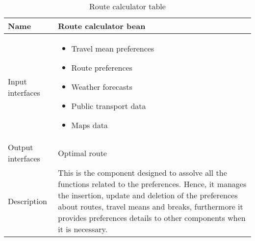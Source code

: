 \begin{flushleft}
	
	\begin{table}[htp]
		
		\begin{tabular}{l|p{7cm}}
		
			Name&\textbf{Route calculator bean}\\
			\hline
			\hline
			Input interfaces& 
			\begin{itemize}
				\item Travel mean preferences \item Route preferences \item Weather forecasts \item Public transport data \item Maps data
			\end{itemize} \\
			\hline
			Output interfaces& Optimal route\\
			\hline
			Description&This is the component designed to assolve all the functions related to the preferences. Hence, it manages the insertion, update and deletion of the preferences about routes, travel means and breaks, furthermore it provides preferences details to other components when it is necessary. \\
			\hline
			
		\end{tabular}
		
		\caption{Route calculator table } 
		\label{tab:routecalculatortable}
		
	\end{table}
	
\end{flushleft}


